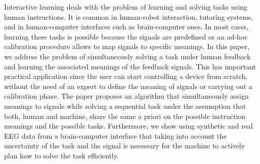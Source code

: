 Interactive learning deals with the problem of learning and solving tasks using human instructions. It is common in human-robot interaction, tutoring systems, and in human-computer interfaces such as brain-computer ones. In most cases, learning these tasks is possible because the signals are predefined or an ad-hoc calibration procedure allows to map signals to specific meanings. In this paper, we address the problem of simultaneously solving a task under human feedback and learning the associated meanings of the feedback signals. 
This has important practical application since the user can start controlling a device from scratch, without the need of an expert to define the meaning of signals or carrying out a calibration phase. The paper proposes an algorithm that simultaneously assign meanings to signals while solving a sequential task under the assumption that both, human and machine, share the same a priori on the possible instruction meanings and the possible tasks. Furthermore, we show using synthetic and real EEG data from a brain-computer interface that taking into account the uncertainty of the task and the signal is necessary for the machine to actively plan how to solve the task efficiently. 




